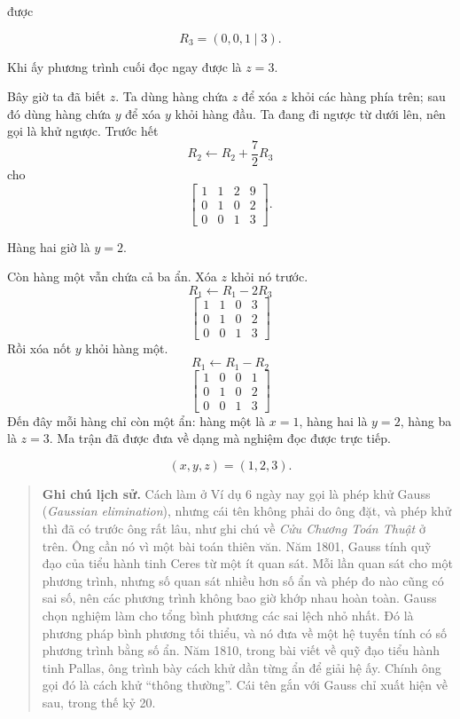 \documentclass[12pt,a4paper]{article}
\begin{document}
được

$$ R_3=(0,0,1\mid3). $$

Khi ấy phương trình cuối đọc ngay được là \(z=3\).

Bây giờ ta đã biết \(z\). Ta dùng hàng chứa \(z\) để xóa \(z\) khỏi các hàng phía trên; sau đó dùng hàng chứa \(y\) để xóa \(y\) khỏi hàng đầu. Ta đang đi ngược từ dưới lên, nên gọi là khử ngược. Trước hết
$$ R_2\leftarrow R_2+\frac72R_3 $$
cho
$$
\left[ \begin{array}{ccc|c} 1 & 1 & 2 & 9 \\ 0 & 1 & 0 & 2 \\ 0 & 0 & 1 & 3 \end{array} \right].
$$

Hàng hai giờ là \(y=2\).

Còn hàng một vẫn chứa cả ba ẩn. Xóa \(z\) khỏi nó trước.
$$ R_1\leftarrow R_1-2R_3 $$
$$
\left[ \begin{array}{ccc|c} 1 & 1 & 0 & 3 \\ 0 & 1 & 0 & 2 \\ 0 & 0 & 1 & 3 \end{array} \right]
$$
Rồi xóa nốt \(y\) khỏi hàng một.
$$ R_1\leftarrow R_1-R_2 $$
$$
\left[ \begin{array}{ccc|c} 1 & 0 & 0 & 1 \\ 0 & 1 & 0 & 2 \\ 0 & 0 & 1 & 3 \end{array} \right]
$$
Đến đây mỗi hàng chỉ còn một ẩn: hàng một là \(x=1\), hàng hai là \(y=2\), hàng ba là \(z=3\). Ma trận đã được đưa về dạng mà nghiệm đọc được trực tiếp.

$$ (x,y,z)=(1,2,3). $$

\begin{quote}
\textbf{Ghi chú lịch sử.} Cách làm ở Ví dụ 6 ngày nay gọi là phép khử Gauss (\emph{Gaussian elimination}), nhưng cái tên không phải do ông đặt, và phép khử thì đã có trước ông rất lâu, như ghi chú về \emph{Cửu Chương Toán Thuật} ở trên. Ông cần nó vì một bài toán thiên văn. Năm 1801, Gauss tính quỹ đạo của tiểu hành tinh Ceres từ một ít quan sát. Mỗi lần quan sát cho một phương trình, nhưng số quan sát nhiều hơn số ẩn và phép đo nào cũng có sai số, nên các phương trình không bao giờ khớp nhau hoàn toàn. Gauss chọn nghiệm làm cho tổng bình phương các sai lệch nhỏ nhất. Đó là phương pháp bình phương tối thiểu, và nó đưa về một hệ tuyến tính có số phương trình bằng số ẩn. Năm 1810, trong bài viết về quỹ đạo tiểu hành tinh Pallas, ông trình bày cách khử dần từng ẩn để giải hệ ấy. Chính ông gọi đó là cách khử ``thông thường''. Cái tên gắn với Gauss chỉ xuất hiện về sau, trong thế kỷ 20.
\end{quote}
\end{document}
